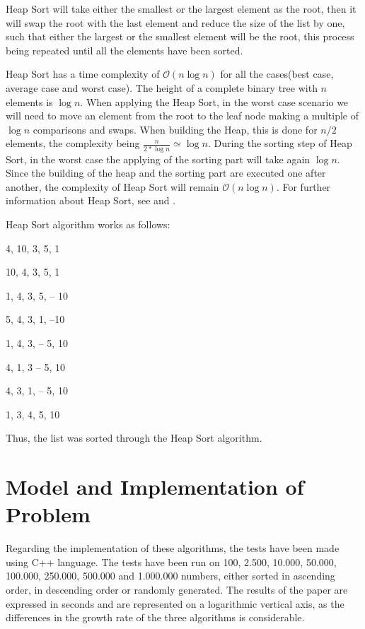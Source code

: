 \documentclass[]{article}
\begin{document}
Heap Sort will take either the smallest or the largest element as the root, then it will swap the root with the last element and reduce the size of the list by one, such that either the largest or the smallest element will be the root, this process being repeated until all the elements have been sorted.

Heap Sort has a time complexity of $\mathcal{O}(n\log{}n)$ for all the cases(best case, average case and worst case). The height of a complete binary tree with $n$ elements is $\log n$. When applying the Heap Sort, in the worst case scenario we will need to move an element from the root to the leaf node making a multiple of $\log n$ comparisons and swaps. When building the Heap, this is done for $n/2$ elements, the complexity being $\textstyle\frac{n}{2*\log n} \simeq \log n$. During the sorting step of Heap Sort, in the worst case the applying of the sorting part will take again $\log n$. Since the building of the heap and the sorting part are executed one after another, the complexity of Heap Sort will remain $\mathcal{O}(n\log{}n)$. For further information about Heap Sort, see \cite{Knuth:1998:Vol3} and \cite{Cormen:2009:IAT}.

\noindent
Heap Sort algorithm works as follows:
\begin{center}
4, 10, 3, 5, 1

10, 4, 3, 5, 1

1, 4, 3, 5, -- 10

5, 4, 3, 1, --10

1, 4, 3, -- 5, 10

4, 1, 3 -- 5, 10

4, 3, 1, -- 5, 10

1, 3, 4, 5, 10
\end{center}

\noindent
Thus, the list was sorted through the Heap Sort algorithm.

	\pagebreak
	
	\section{Model and Implementation of Problem}
\lstset{language=C++}	
	
Regarding the implementation of these algorithms, the tests have been made using C++ language. The tests have been run on 100, 2.500, 10.000, 50.000, 100.000, 250.000, 500.000 and 1.000.000 numbers, either sorted in ascending order, in descending order or randomly generated. The results of the paper are expressed in seconds and are represented on a logarithmic vertical axis, as the differences in the growth rate of the three algorithms is considerable.
\end{document}
